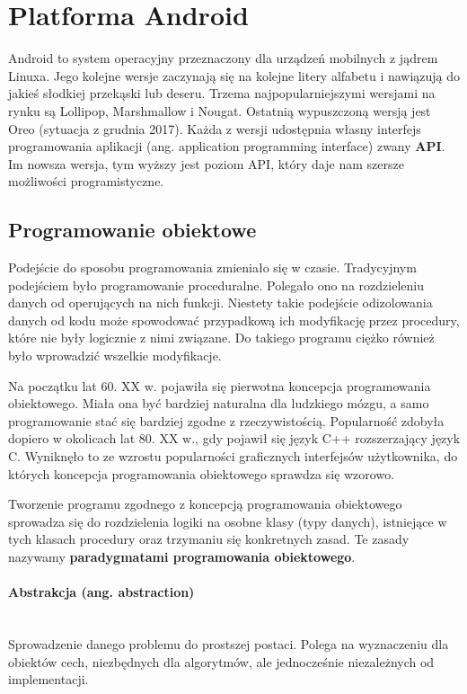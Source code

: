 \documentclass{article}
\let\stdsection\section
\renewcommand\section{\newpage\stdsection}
\numberwithin{equation}{section}
\begin{document}
\section{Platforma Android}
Android to system operacyjny przeznaczony dla urządzeń mobilnych z jądrem Linuxa. Jego kolejne wersje zaczynają się na kolejne litery alfabetu i nawiązują do jakieś słodkiej przekąski lub deseru. Trzema najpopularniejszymi wersjami na rynku są Lollipop, Marshmallow i Nougat. Ostatnią wypuszczoną wersją jest Oreo (sytuacja z grudnia 2017). Każda z wersji udostępnia własny interfejs programowania aplikacji (ang. application programming interface) zwany \textbf{API}. Im nowsza wersja, tym wyższy jest poziom API, który daje nam szersze możliwości programistyczne.
\subsection{Programowanie obiektowe}
Podejście do sposobu programowania zmieniało się w czasie. Tradycyjnym podejściem było programowanie proceduralne. Polegało ono na rozdzieleniu danych od operujących na nich funkcji. Niestety takie podejście odizolowania danych od kodu może spowodować przypadkową ich modyfikację przez procedury, które nie były logicznie z nimi związane. Do takiego programu ciężko również było wprowadzić wszelkie modyfikacje. \par
Na początku lat 60. XX w. pojawiła się pierwotna koncepcja programowania obiektowego. Miała ona być bardziej naturalna dla ludzkiego mózgu, a samo programowanie stać się bardziej zgodne z rzeczywistością. Popularność zdobyła dopiero w okolicach lat 80. XX w., gdy pojawił się język C++ rozszerzający język C. Wyniknęło to ze wzrostu popularności graficznych interfejsów użytkownika, do których koncepcja programowania obiektowego sprawdza się wzorowo.\par Tworzenie programu zgodnego z koncepcją programowania obiektowego sprowadza się do rozdzielenia logiki na osobne klasy (typy danych), istniejące w tych klasach procedury oraz trzymaniu się konkretnych zasad. Te zasady nazywamy \textbf{paradygmatami programowania obiektowego}.
\paragraph{Abstrakcja (ang. abstraction)}\mbox{}\\ Sprowadzenie danego problemu do prostszej postaci. Polega na wyznaczeniu dla obiektów cech, niezbędnych dla algorytmów, ale jednocześnie niezależnych od implementacji.
\end{document}
